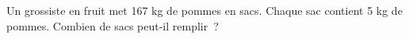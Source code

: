 \documentclass[exercice]{thedocument}%
\begin{document}
%
Un grossiste en fruit met 167 kg de pommes en sacs. Chaque sac contient 5 kg de
pommes.\vskip5pt Combien de sacs peut-il remplir~?
\end{document}
